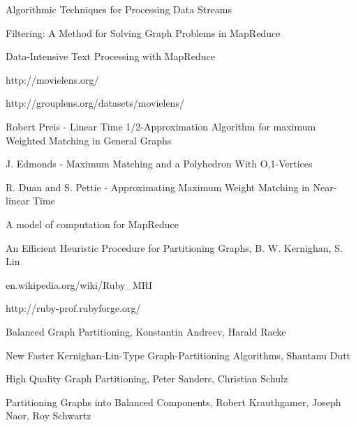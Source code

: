  \begin{thebibliography}{99}

  Algorithmic Techniques for Processing Data Streams

  Filtering: A Method for Solving Graph Problems in MapReduce
  
  Data-Intensive Text Processing with MapReduce
  
  http://movielens.org/
  
  http://grouplens.org/datasets/movielens/
  
  Robert Preis - Linear Time 1/2-Approximation Algorithm for maximum Weighted Matching in General Graphs
  
  J. Edmonds - Maximum Matching and a Polyhedron With O,1-Vertices

  R. Duan and S. Pettie - Approximating Maximum Weight Matching in Near-linear Time

  A model of computation for MapReduce

  An Efficient Heuristic Procedure for Partitioning Graphs, B. W. Kernighan, S. Lin
  
  en.wikipedia.org/wiki/Ruby\_MRI
  
  http://ruby-prof.rubyforge.org/
  
  Balanced Graph Partitioning, Konstantin Andreev, Harald Racke
  
  New Faster Kernighan-Lin-Type Graph-Partitioning Algorithms, Shantanu Dutt

  High Quality Graph Partitioning, Peter Sanders, Christian Schulz

  Partitioning Graphs into Balanced Components,
  Robert Krauthgamer, Joseph Naor, Roy Schwartz
  
  \end{thebibliography}

